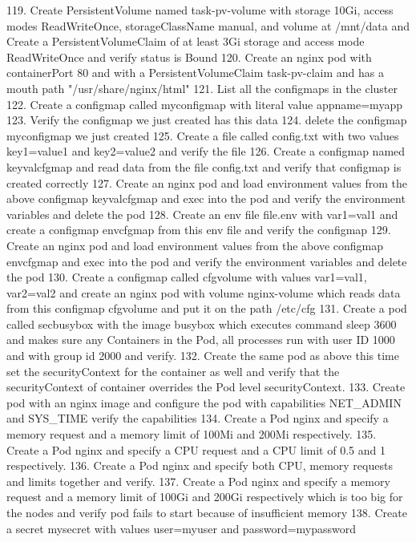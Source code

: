 119. Create PersistentVolume named task-pv-volume with storage 10Gi, access modes ReadWriteOnce, storageClassName manual, and volume at /mnt/data and Create a PersistentVolumeClaim of at 
least 3Gi storage and access mode ReadWriteOnce and verify status is Bound
120. Create an nginx pod with containerPort 80 and with a PersistentVolumeClaim task-pv-claim and has a mouth path "/usr/share/nginx/html"
121. List all the configmaps in the cluster
122. Create a configmap called myconfigmap with literal value appname=myapp
123. Verify the configmap we just created has this data
124. delete the configmap myconfigmap we just created
125. Create a file called config.txt with two values key1=value1 and key2=value2 and verify the file
126. Create a configmap named keyvalcfgmap and read data from the file config.txt and verify that configmap is created correctly
127. Create an nginx pod and load environment values from the above configmap keyvalcfgmap and exec into the pod and verify the environment variables and delete the pod
128. Create an env file file.env with var1=val1 and create a configmap envcfgmap from this env file and verify the configmap
129. Create an nginx pod and load environment values from the above configmap envcfgmap and exec into the pod and verify the environment variables and delete the pod
130. Create a configmap called cfgvolume with values var1=val1, var2=val2 and create an nginx pod with volume nginx-volume which reads data from this configmap cfgvolume and put it on the path /etc/cfg
131. Create a pod called secbusybox with the image busybox which executes command sleep 3600 and makes sure any Containers in the Pod, all processes run with user ID 1000 and with group id 2000 and verify.
132. Create the same pod as above this time set the securityContext for the container as well and verify that the securityContext of container overrides the Pod level securityContext.
133. Create pod with an nginx image and configure the pod with capabilities NET_ADMIN and SYS_TIME verify the capabilities
134. Create a Pod nginx and specify a memory request and a memory limit of 100Mi and 200Mi respectively.
135. Create a Pod nginx and specify a CPU request and a CPU limit of 0.5 and 1 respectively.
136. Create a Pod nginx and specify both CPU, memory requests and limits together and verify.
137. Create a Pod nginx and specify a memory request and a memory limit of 100Gi and 200Gi respectively which is too big for the nodes and verify pod fails to start because of insufficient memory
138. Create a secret mysecret with values user=myuser and password=mypassword
